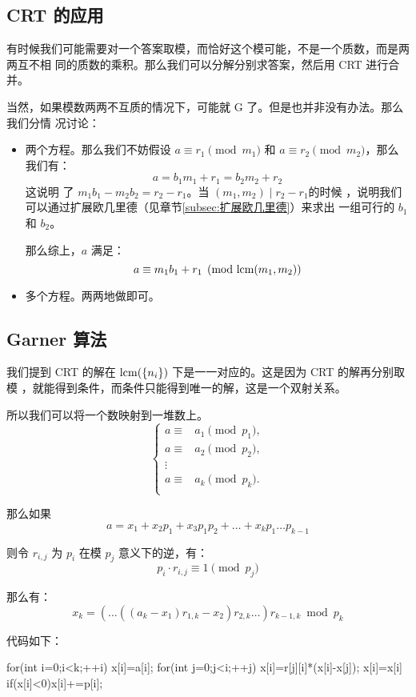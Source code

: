 \subsection{CRT 的应用}
有时候我们可能需要对一个答案取模，而恰好这个模可能，不是一个质数，而是两两互不相
同的质数的乘积。那么我们可以分解分别求答案，然后用 CRT 进行合并。

当然，如果模数两两不互质的情况下，可能就 G 了。但是也并非没有办法。那么我们分情
况讨论：
\begin{itemize}
    \item 两个方程。那么我们不妨假设 $a \equiv r_1 \pmod {m_1}$ 和 $a \equiv r_2
        \pmod {m_2}$，那么我们有：\[ a = b_1 m_1 + r_1 = b_2 m_2 + r_2 \]这说明
        了 $m_1 b_1 - m_2 b_2 = r_2 - r_1$。当 $(m_1, m_2) \mid r_2 - r_1$的时候
        ，说明我们可以通过扩展欧几里德（见章节\ref{subsec:扩展欧几里德}）来求出
        一组可行的 $b_1$ 和 $b_2$。

        那么综上，$a$ 满足：\[a \equiv m_1 b_1 + r_1 \pmod{\mathrm{lcm}(m_1, m_2)}\]
    \item 多个方程。两两地做即可。
\end{itemize}



\subsection{Garner 算法}
我们提到 CRT 的解在 $\mathrm{lcm}(\{n_i\})$ 下是一一对应的。这是因为 CRT 的解再分别取模
，就能得到条件，而条件只能得到唯一的解，这是一个双射关系。

所以我们可以将一个数映射到一堆数上。\[
    \left\{
        \begin{aligned}
            a \equiv{}&{} a_1 \pmod {p_1}, \\
            a \equiv{}&{} a_2 \pmod {p_2}, \\
              \vdots{}&{} \\
            a \equiv{}&{} a_k \pmod {p_k}. \\
        \end{aligned}
    \right.
\]

那么如果\[
a = x_1 + x_2 p_1 + x_3 p_1 p_2 + \ldots + x_k p_1 \ldots p_{k-1}
\]

则令 $r_{i,j}$ 为 $p_i$ 在模 $p_j$ 意义下的逆，有：\[
p_i \cdot r_{i,j} \equiv 1 \pmod{p_j}
\]

那么有：\[
    x_k=(\ldots ((a_k-x_1)r_{1,k}-x_2)r_{2,k} \ldots)r_{k-1,k} \bmod p_k
\]

代码如下：
\begin{Cpp}
for(int i=0;i<k;++i) {
  x[i]=a[i];
  for(int j=0;j<i;++j) {
    x[i]=r[j][i]*(x[i]-x[j]);
    x[i]=x[i]%
    if(x[i]<0)x[i]+=p[i];
  }
}
\end{Cpp}


